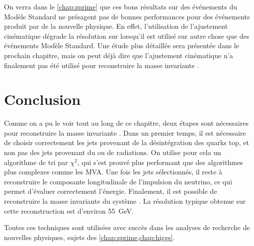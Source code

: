 \bigskip

On verra dans le \cref{chap:zprime} que ces bons résultats sur des événements \ttbar du Modèle Standard ne présagent pas de bonnes performances pour des événements \ttbar produit par de la nouvelle physique. En effet, l'utilisation de l'ajustement cinématique dégrade la résolution sur \mtt lorsqu'il est utilisé sur autre chose que des événements \ttbar Modèle Standard. Une étude plus détaillée sera présentée dans le prochain chapitre, mais on peut déjà dire que l'ajustement cinématique n'a finalement pas été utilisé pour reconstruire la masse invariante \ttbar.

\section{Conclusion}

Comme on a pu le voir tout au long de ce chapitre, deux étapes sont nécessaires pour reconstruire la masse invariante \ttbar. Dans un premier temps, il est nécessaire de choisir correctement les jets provenant de la désintégration des quarks top, et non pas des jets provenant du \pu ou de radiations. On utilise pour cela un algorithme de tri par $\chi^2$, qui s'est prouvé plus performant que des algorithmes plus complexes comme les MVA. Une fois les jets sélectionnés, il reste à reconstruire le composante longitudinale de l'impulsion du neutrino, ce qui permet d'évaluer correctement l'énergie. Finalement, il est possible de reconstruire la masse invariante du système \ttbar. La résolution typique obtenue sur cette reconstruction est d'environ \SI{55}{\GeV}.

\bigskip

Toutes ces techniques sont utilisées avec succès dans les analyses de recherche de nouvelles physiques, sujets des \cref{chap:zprime,chap:higgs}.